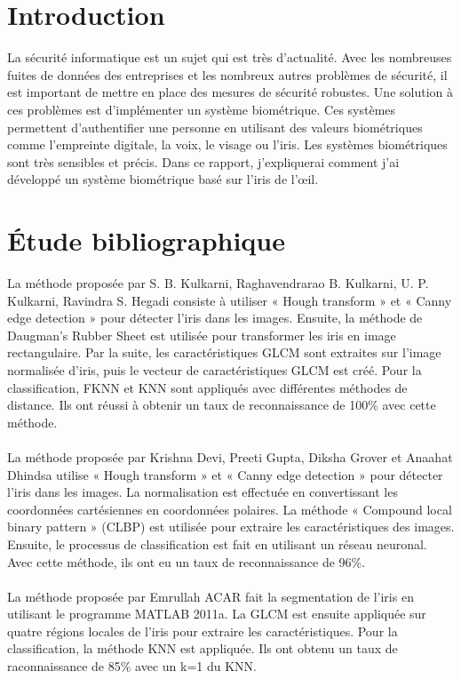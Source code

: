 \documentclass[12pt,twoside,letterpaper]{article}
\begin{document}



\tableofcontents
\newpage

\section{Introduction}
La sécurité informatique est un sujet qui est très d'actualité. Avec les nombreuses fuites de données des entreprises et les nombreux autres problèmes de sécurité, il est important de mettre en place des mesures de sécurité robustes. Une solution à ces problèmes est d'implémenter un système biométrique. Ces systèmes permettent d'authentifier une personne en utilisant des valeurs biométriques comme l'empreinte digitale, la voix, le visage ou l'iris. Les systèmes biométriques sont très sensibles et précis. Dans ce rapport, j'expliquerai comment j'ai développé un système biométrique basé sur l’iris de l’œil.
\cite{ref_06}

\section{Étude bibliographique}

La méthode proposée par S. B. Kulkarni, Raghavendrarao B. Kulkarni, U. P. Kulkarni, Ravindra S. Hegadi consiste à utiliser « Hough transform » et « Canny edge detection » pour détecter l'iris dans les images. Ensuite, la méthode de Daugman's Rubber Sheet est utilisée pour transformer les iris en image rectangulaire. Par la suite, les caractéristiques GLCM sont extraites sur l'image normalisée d'iris, puis le vecteur de caractéristiques GLCM est créé. Pour la classification, FKNN et KNN sont appliqués avec différentes méthodes de distance. Ils ont réussi à obtenir un taux de reconnaissance de 100\% avec cette méthode.\cite{ref_07}
\\~\\
La méthode proposée par Krishna Devi, Preeti Gupta, Diksha Grover et Anaahat Dhindsa utilise « Hough transform » et « Canny edge detection »  pour détecter l'iris dans les images. La normalisation est effectuée en convertissant les coordonnées cartésiennes en coordonnées polaires. La méthode « Compound local binary pattern » (CLBP) est utilisée pour extraire les caractéristiques des images. Ensuite, le processus de classification est fait en utilisant un réseau neuronal. Avec cette méthode, ils ont eu un taux de reconnaissance de 96\%.\cite{ref_08}
\\~\\
La méthode proposée par Emrullah ACAR fait la segmentation de l'iris en utilisant le programme MATLAB 2011a. La GLCM est ensuite appliquée sur quatre régions locales de l'iris pour extraire les caractéristiques. Pour la classification, la méthode KNN est appliquée. Ils ont obtenu un taux de raconnaissance de 85\% avec un k=1 du KNN.\cite{ref_09}
\\~\\
\end{document}
